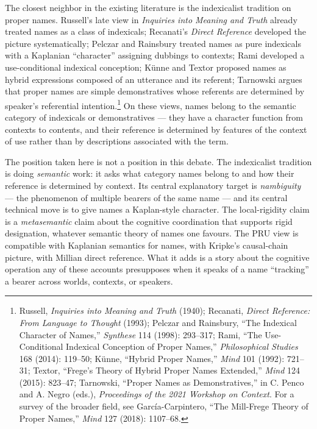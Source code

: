 \documentclass[10pt]{article}
\begin{document}
The closest neighbor in the existing literature is the indexicalist tradition on proper names. Russell's late view in \emph{Inquiries into Meaning and Truth} already treated names as a class of indexicals; Recanati's \emph{Direct Reference} developed the picture systematically; Pelczar and Rainsbury treated names as pure indexicals with a Kaplanian ``character'' assigning dubbings to contexts; Rami developed a use-conditional indexical conception; Künne and Textor proposed names as hybrid expressions composed of an utterance and its referent; Tarnowski argues that proper names are simple demonstratives whose referents are determined by speaker's referential intention.\footnote{Russell, \emph{Inquiries into Meaning and Truth} (1940); Recanati, \emph{Direct Reference: From Language to Thought} (1993); Pelczar and Rainsbury, ``The Indexical Character of Names,'' \emph{Synthese} 114 (1998): 293--317; Rami, ``The Use-Conditional Indexical Conception of Proper Names,'' \emph{Philosophical Studies} 168 (2014): 119--50; Künne, ``Hybrid Proper Names,'' \emph{Mind} 101 (1992): 721--31; Textor, ``Frege's Theory of Hybrid Proper Names Extended,'' \emph{Mind} 124 (2015): 823--47; Tarnowski, ``Proper Names as Demonstratives,'' in C. Penco and A. Negro (eds.), \emph{Proceedings of the 2021 Workshop on Context}. For a survey of the broader field, see García-Carpintero, ``The Mill-Frege Theory of Proper Names,'' \emph{Mind} 127 (2018): 1107--68.} On these views, names belong to the semantic category of indexicals or demonstratives --- they have a character function from contexts to contents, and their reference is determined by features of the context of use rather than by descriptions associated with the term.

The position taken here is not a position in this debate. The indexicalist tradition is doing \emph{semantic} work: it asks what category names belong to and how their reference is determined by context. Its central explanatory target is \emph{nambiguity} --- the phenomenon of multiple bearers of the same name --- and its central technical move is to give names a Kaplan-style character. The local-rigidity claim is a \emph{metasemantic} claim about the cognitive coordination that supports rigid designation, whatever semantic theory of names one favours. The PRU view is compatible with Kaplanian semantics for names, with Kripke's causal-chain picture, with Millian direct reference. What it adds is a story about the cognitive operation any of these accounts presupposes when it speaks of a name ``tracking'' a bearer across worlds, contexts, or speakers.
\end{document}
